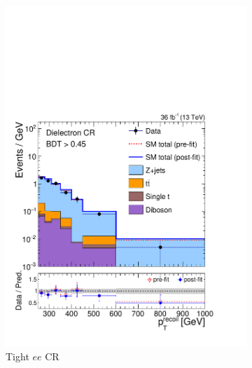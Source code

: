 \begin{figure}[]
\begin{center}
\begin{subfigure}[t]{0.24\textwidth}
            \includegraphics[width=\textwidth]{figures/monotop/postfit/stackedPostfit_dielectron_monotop.pdf}
            \caption{Tight $ee$ CR}
        \end{subfigure}
        \begin{subfigure}[t]{0.24\textwidth}

\end{subfigure}
\end{center}
\end{figure}
